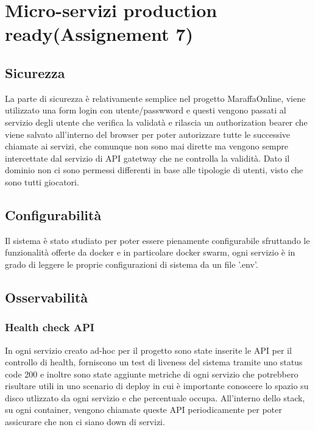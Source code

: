 \chapter{Micro-servizi production ready(Assignement 7)}
\label{ch:production_ready}

\section{Sicurezza}

La parte di sicurezza è relativamente semplice nel progetto MaraffaOnline, viene utilizzato una form login con utente/passwword e questi vengono passati al servizio degli utente che verifica la validatà e rilascia un authorization bearer che viene salvato all'interno del browser per poter autorizzare tutte le successive chiamate ai servizi, che comunque non sono mai dirette ma vengono sempre intercettate dal servizio di API gatetway che ne controlla la validità. 
Dato il dominio non ci sono permessi differenti in base alle tipologie di utenti, visto che sono tutti giocatori.

\section{Configurabilità}

Il sistema è stato studiato per poter essere pienamente configurabile sfruttando le funzionalità offerte da docker e in particolare docker swarm, ogni servizio è in grado di leggere le proprie configurazioni di sistema da un file '.env'.

\section{Osservabilità}

\subsection{Health check API}

In ogni servizio creato ad-hoc per il progetto sono state inserite le API per il controllo di health, forniscono un test di liveness del sistema tramite uno status code 200 e inoltre sono state aggiunte metriche di ogni servizio che potrebbero risultare utili in uno scenario di deploy in cui è importante conoscere lo spazio su disco utlizzato da ogni servizio e che percentuale occupa. 
All'interno dello stack, su ogni container, vengono chiamate queste API periodicamente per poter assicurare che non ci siano down di servizi.

